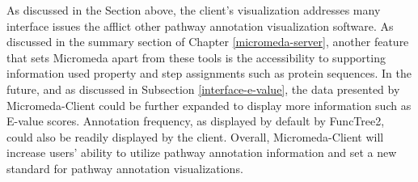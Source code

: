 As discussed in the Section above, the client's visualization addresses many interface issues the afflict other pathway annotation visualization software. As discussed in the summary section of Chapter \ref{micromeda-server}, another feature that sets Micromeda apart from these tools is the accessibility to supporting information used property and step assignments such as protein sequences. In the future, and as discussed in Subsection \ref{interface-e-value}, the data presented by Micromeda-Client could be further expanded to display more information such as E-value scores. Annotation frequency, as displayed by default by FuncTree2, could also be readily displayed by the client. Overall, Micromeda-Client will increase users' ability to utilize pathway annotation information and set a new standard for pathway annotation visualizations.